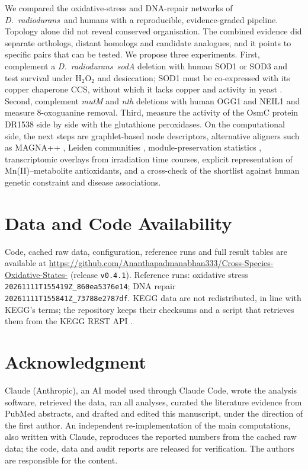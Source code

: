 \documentclass[conference]{IEEEtran}
\newcommand{\Dr}{\emph{D.~radiodurans}}
\newcommand{\gene}[1]{\textit{#1}}
\begin{document}
We compared the oxidative-stress and DNA-repair networks of \Dr\ and humans with a reproducible,
evidence-graded pipeline. Topology alone did not reveal conserved organisation. The combined
evidence did separate orthologs, distant homologs and candidate analogues, and it points to
specific pairs that can be tested. We propose three experiments. First, complement a \Dr\
\gene{sodA} deletion with human SOD1 or SOD3 and test survival under H$_2$O$_2$ and desiccation;
SOD1 must be co-expressed with its copper chaperone CCS, without which it lacks copper and activity
in yeast \cite{culotta1997}. Second, complement \gene{mutM} and \gene{nth} deletions with human
OGG1 and NEIL1 and measure 8-oxoguanine removal. Third, measure the activity of the OsmC protein
DR1538 side by side with the glutathione peroxidases. On the computational side,
the next steps are graphlet-based node descriptors, alternative aligners such as MAGNA++
\cite{magna}, Leiden communities
\cite{leiden}, module-preservation statistics \cite{langfelder2011}, transcriptomic overlays from
irradiation time courses, explicit representation of Mn(II)--metabolite antioxidants, and a
cross-check of the shortlist against human genetic constraint and disease associations.

\section*{Data and Code Availability}

{\raggedright
Code, cached raw data, configuration, reference runs and full result tables are available at
\url{https://github.com/Ananthapadmanabhan333/Cross-Species-Oxidative-States-} (release
\texttt{v0.4.1}). Reference runs: oxidative stress \texttt{20261111T155419Z\_860ea5376e14}; DNA
repair \texttt{20261111T155841Z\_73788e2787df}. KEGG data are not redistributed, in line with
KEGG's terms; the repository keeps their checksums and a script that retrieves them from the
KEGG REST API \cite{kanehisa2000,kegg2025}.\par}

\section*{Acknowledgment}

Claude (Anthropic), an AI model used through Claude Code, wrote the analysis software, retrieved
the data, ran all analyses, curated the literature evidence from PubMed abstracts, and drafted and
edited this manuscript, under the direction of the first author. An independent re-implementation of the main
computations, also written with Claude, reproduces the reported numbers from the cached raw data;
the code, data and audit reports are released for verification. The authors are responsible for
the content.
\end{document}
